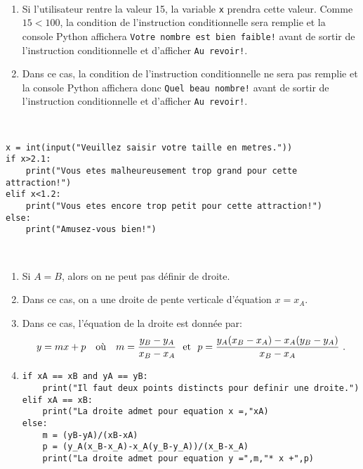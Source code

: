 \begin{correction}~
	\begin{enumerate}
		\item Si l'utilisateur rentre la valeur 15, la variable \texttt{x} prendra cette valeur. Comme  $15<100$, la condition de l'instruction conditionnelle sera remplie et la console Python affichera \texttt{Votre nombre est bien faible!} avant de sortir de l'instruction conditionnelle et d'afficher \texttt{Au revoir!}.
		\item Dans ce cas, la condition de l'instruction conditionnelle ne sera pas remplie et la console Python affichera donc \texttt{Quel beau nombre!} avant de sortir de l'instruction conditionnelle et d'afficher \texttt{Au revoir!}.
	\end{enumerate}
\end{correction}

\begin{correction}~
	\begin{center}
		\begin{varwidth}[t]{\textwidth}
	\begin{lstlisting}[language=iPython,linewidth = 15cm]
x = int(input("Veuillez saisir votre taille en metres."))
if x>2.1:
    print("Vous etes malheureusement trop grand pour cette attraction!")
elif x<1.2:
    print("Vous etes encore trop petit pour cette attraction!")
else:
    print("Amusez-vous bien!")
\end{lstlisting}
		\end{varwidth}
\end{center}
\end{correction}

\begin{correction}~
	\begin{enumerate}
		\item Si $A=B$, alors on ne peut pas définir de droite.
		\item Dans ce cas, on a une droite de pente verticale d'équation $x=x_A$.
		\item Dans ce cas, l'équation de la droite est donnée par: $$y = mx+p~~\textnormal{ où }~~m=\dfrac{y_B-y_A}{x_B-x_A}~\textnormal{ et }~p=\dfrac{y_A(x_B-x_A)-x_A(y_B-y_A)}{x_B-x_A}~.$$
		\item 
	\begin{center}
		\begin{varwidth}[t]{\textwidth}
	\begin{lstlisting}[language=iPython,linewidth = 15cm]
if xA == xB and yA == yB:
    print("Il faut deux points distincts pour definir une droite.")
elif xA == xB:
    print("La droite admet pour equation x =,"xA)
else:
    m = (yB-yA)/(xB-xA)
    p = (y_A(x_B-x_A)-x_A(y_B-y_A))/(x_B-x_A)
    print("La droite admet pour equation y =",m,"* x +",p)
\end{lstlisting}
		\end{varwidth}
\end{center}
	\end{enumerate}
\end{correction}

